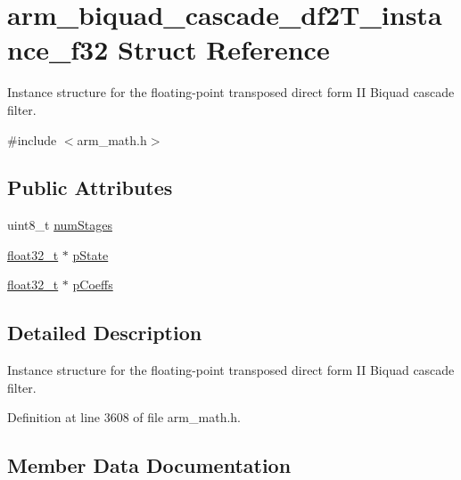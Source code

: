 \hypertarget{structarm__biquad__cascade__df2_t__instance__f32}{}\section{arm\+\_\+biquad\+\_\+cascade\+\_\+df2\+T\+\_\+instance\+\_\+f32 Struct Reference}
\label{structarm__biquad__cascade__df2_t__instance__f32}


Instance structure for the floating-\/point transposed direct form II Biquad cascade filter.  




{\ttfamily \#include $<$arm\+\_\+math.\+h$>$}

\subsection*{Public Attributes}
\begin{DoxyCompactItemize}
\item 
uint8\+\_\+t \hyperlink{structarm__biquad__cascade__df2_t__instance__f32_a4d17958c33c3d0a905f974bac50f033f}{num\+Stages}
\item 
\hyperlink{arm__math_8h_a4611b605e45ab401f02cab15c5e38715}{float32\+\_\+t} $\ast$ \hyperlink{structarm__biquad__cascade__df2_t__instance__f32_a24d223addfd926a7177088cf2efe76b1}{p\+State}
\item 
\hyperlink{arm__math_8h_a4611b605e45ab401f02cab15c5e38715}{float32\+\_\+t} $\ast$ \hyperlink{structarm__biquad__cascade__df2_t__instance__f32_a49a24fe1b6ad3b0b26779c32d8d80b2e}{p\+Coeffs}
\end{DoxyCompactItemize}


\subsection{Detailed Description}
Instance structure for the floating-\/point transposed direct form II Biquad cascade filter. 

Definition at line 3608 of file arm\+\_\+math.\+h.



\subsection{Member Data Documentation}
\mbox{\label{structarm__biquad__cascade__df2_t__instance__f32_a4d17958c33c3d0a905f974bac50f033f}} 
